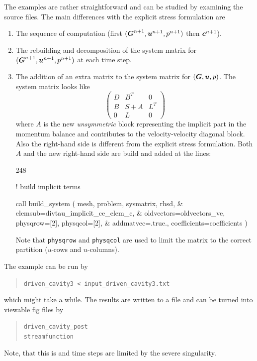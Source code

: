 The examples are rather straightforward and can be studied by examining the
source files. The main differences with the explicit stress formulation are
\begin{enumerate}
   \item The sequence of computation 
          (first $(\boldsymbol{G}^{n+1},\boldsymbol{u}^{n+1},p^{n+1})$ then $\boldsymbol{c}^{n+1}$).
   \item The rebuilding and decomposition of the system matrix for 
         $(\boldsymbol{G}^{n+1},\boldsymbol{u}^{n+1},p^{n+1})$ at each time step.
   \item The addition of an extra matrix to 
 the system matrix for $(\boldsymbol{G},\boldsymbol{u}, p)$. The system matrix looks like
\[
   \begin{pmatrix}
      D  &  B^T &  0 \\
      B  &  S +A &  L^T \\
      0  &  L    &  0  
   \end{pmatrix}
\]
where $A$ is the new \emph{unsymmetric} block representing the implicit
part in the momentum
balance and contributes to the velocity-velocity diagonal block.
Also the right-hand side is different from the explicit stress
formulation. Both $A$ and the new right-hand side are build and added
at the lines:
\begin{listing}{248}

!   build implicit terms

    call build_system ( mesh, problem, sysmatrix, rhsd, &
      elemsub=divtau_implicit_ce_elem_c, &
      oldvectors=oldvectors_ve, physqrow=[2], physqcol=[2], &
      addmatvec=.true., coefficients=coefficients )

\end{listing}
Note that \texttt{physqrow} and \texttt{physqcol} are used to limit the matrix
to the correct partition ($u$-rows and $u$-columns).
\end{enumerate}

The example can be run by
\begin{quote}
   \texttt{driven\_cavity3 < input\_driven\_cavity3.txt}
\end{quote}
which might take a while.
The results are written to a file and can be turned into viewable fig files by
\begin{quote}
   \texttt{driven\_cavity\_post}\\
   \texttt{streamfunction}
\end{quote}

Note, that this is  and time steps are limited by
the severe singularity.

